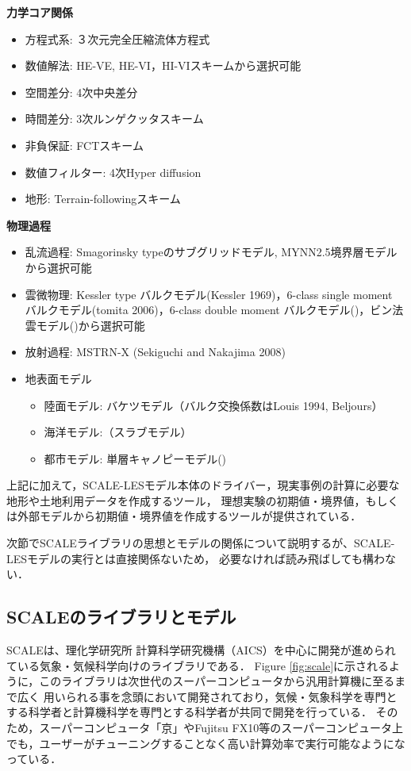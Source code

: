 {\bf 力学コア関係}

\begin{itemize}
 \item 方程式系: ３次元完全圧縮流体方程式
 \item 数値解法: HE-VE,  HE-VI，HI-VIスキームから選択可能
 \item 空間差分: 4次中央差分
 \item 時間差分: 3次ルンゲクッタスキーム
 \item 非負保証: FCTスキーム
 \item 数値フィルター: 4次Hyper diffusion
 \item 地形: Terrain-followingスキーム
\end{itemize}

{\bf 物理過程}

\begin{itemize}
 \item 乱流過程: Smagorinsky typeのサブグリッドモデル, MYNN2.5境界層モデルから選択可能
 \item 雲微物理: Kessler type バルクモデル(Kessler 1969)，6-class single moment バルクモデル(tomita 2006)，6-class double moment バルクモデル(\cite{sn_2014})，ビン法雲モデル(\cite{suzuki_etal_2010})から選択可能
 \item 放射過程: MSTRN-X (Sekiguchi and Nakajima 2008)
 \item 地表面モデル
  \begin{itemize}
   \item 陸面モデル: バケツモデル（バルク交換係数はLouis 1994, Beljours）
   \item 海洋モデル:（スラブモデル）
   \item 都市モデル: 単層キャノピーモデル(\cite{kusaka_2001})
  \end{itemize}
\end{itemize}

上記に加えて，SCALE-LESモデル本体のドライバー，現実事例の計算に必要な地形や土地利用データを作成するツール，
理想実験の初期値・境界値，もしくは外部モデルから初期値・境界値を作成するツールが提供されている．

次節でSCALEライブラリの思想とモデルの関係について説明するが、SCALE-LESモデルの実行とは直接関係ないため，
必要なければ読み飛ばしても構わない．


\subsection{SCALEのライブラリとモデル}
SCALEは、理化学研究所 計算科学研究機構（AICS）を中心に開発が進められている気象・気候科学向けのライブラリである．
Figure \ref{fig:scale}に示されるように，このライブラリは次世代のスーパーコンピュータから汎用計算機に至るまで広く
用いられる事を念頭において開発されており，気候・気象科学を専門とする科学者と計算機科学を専門とする科学者が共同で開発を行っている．
そのため，スーパーコンピュータ「京」やFujitsu FX10等のスーパーコンピュータ上でも，ユーザーがチューニングすることなく高い計算効率で実行可能なようになっている．

